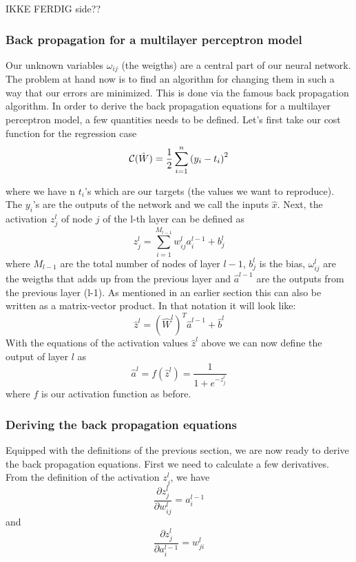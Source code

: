 \documentclass[a4paper,12pt]{article}
\begin{document}
IKKE FERDIG side??

\subsubsection{Back propagation for a multilayer perceptron model}
Our unknown variables $\omega_{ij}$ (the weigths) are a central part of our neural network. The problem at hand now is to find an algorithm for changing them in such a way that our errors are minimized. This is done via the famous back propagation algorithm.\newline 
In order to derive the back propagation equations for a multilayer perceptron model, a few quantities needs to be defined. Let's first take our cost function for the regression case 
\begin{equation}
   {\cal C}(\hat{W})  =  \frac{1}{2}\sum_{i=1}^n\left(y_i - t_i\right)^2 
\end{equation}

where we have n $t_i$'s which are our targets (the values we want to reproduce). The $y_i$'s are the outputs of the network and we call the inputs $\hat{x}$.\newline
Next, the activation $z_j^l$ of node $j$ of the l-th layer can be defined as
\begin{equation}
    z_j^l = \sum_{i=1}^{M_{l-1}}w_{ij}^la_i^{l-1}+b_j^l
\end{equation}
where $M_{l-1}$ are the total number of nodes of layer $l-1$, $b_j^l$ is the bias, $\omega_{ij}^l$ are the weigths that adds up from the previous layer and $\hat{a}^{l-1}$ are the outputs from the previous layer (l-1). As mentioned in an earlier section this can also be written as a matrix-vector product. In that notation it will look like:
\begin{equation}
    \hat{z}^l = \left(\hat{W}^l\right)^T\hat{a}^{l-1}+\hat{b}^l
\end{equation}
With the equations of the activation values $\hat{z}^l$ above we can now define the output of layer $l$ as
\begin{equation}
    \hat{a}^l = f(\hat{z}^l) = \frac{1}{1 + e^{-z_j^l}}
\end{equation}
where $f$ is our activation function as before.\newline

\subsubsection{Deriving the back propagation equations}
Equipped with the definitions of the previous section, we are now ready to derive the back propagation equations. First we need to calculate a few derivatives.\newline
From the definition of the activation $z_j^l$, we have
\begin{equation}
    \frac{\partial z_j^l}{\partial w_{ij}^l} = a_i^{l-1}
\end{equation}
and
\begin{equation}
    \frac{\partial z_j^l}{\partial a_i^{l-1}} = w_{ji}^l
\end{equation}
\end{document}
